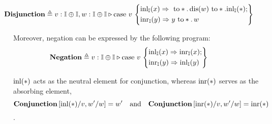 \begin{align*}
  & \hspace{-25pt}\textbf{Disjunction} \triangleq v:\typeI \oplus \typeI, w:\typeI \oplus \typeI \vljud \text{case } v\,
\left\{
    \begin{aligned} 
    &\inl_{\typeI}(x) \Rightarrow  \text{ to} *. \,  \text{dis}(w) \text{ to} *. \inl_{\typeI}(*) ; \\
    &\inr_{\typeI}(y) \Rightarrow  y \text{ to} *. \,  w  \\ 
  \end{aligned}  
  \right\}
\end{align*}

Moreover, negation can be expressed by the following program:
  \begin{align*}
  & \hspace{-25pt}\textbf{Negation} \triangleq v:\typeI \oplus \typeI \vljud \text{case } v\,
\left\{
    \begin{aligned} 
    &\inl_{\typeI}(x) \Rightarrow \inr_{\typeI}(x) ; \\
    &\inr_{\typeI}(y) \Rightarrow  \inl_{\typeI}(y)  \\ 
  \end{aligned}  
  \right\}
\end{align*}

  \begin{lemma} \label{lemma:inl_neutral}
     $\mathrm{inl}(*)$ acts as the neutral element for conjunction, whereas $\mathrm{inr}(*)$ serves as the absorbing element, \ie
     $$ \textbf{Conjunction} \, [\mathrm{inl}(*)/v,w'/w ] = w'  \quad \text{and} \quad \textbf{Conjunction} \, [\mathrm{inr}(*)/v,w'/w ] = \mathrm{inr}(*)$$.
  \end{lemma}

